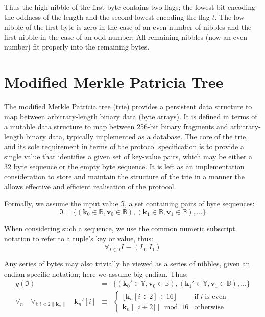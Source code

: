 \documentclass[9pt,oneside]{amsart}
\begin{document}
Thus the high nibble of the first byte contains two flags; the lowest bit encoding the oddness of the length and the second-lowest encoding the flag $t$. The low nibble of the first byte is zero in the case of an even number of nibbles and the first nibble in the case of an odd number. All remaining nibbles (now an even number) fit properly into the remaining bytes.

\section{Modified Merkle Patricia Tree}\label{app:trie}
The modified Merkle Patricia tree (trie) provides a persistent data structure to map between arbitrary-length binary data (byte arrays). It is defined in terms of a mutable data structure to map between 256-bit binary fragments and arbitrary-length binary data, typically implemented as a database. The core of the trie, and its sole requirement in terms of the protocol specification is to provide a single value that identifies a given set of key-value pairs, which may be either a 32 byte sequence or the empty byte sequence. It is left as an implementation consideration to store and maintain the structure of the trie in a manner the allows effective and efficient realisation of the protocol.

Formally, we assume the input value $\mathfrak{I}$, a set containing pairs of byte sequences:
\begin{equation}
\mathfrak{I} = \{ (\mathbf{k}_0 \in \mathbb{B}, \mathbf{v}_0 \in \mathbb{B}), (\mathbf{k}_1 \in \mathbb{B}, \mathbf{v}_1 \in \mathbb{B}), ... \}
\end{equation}

When considering such a sequence, we use the common numeric subscript notation to refer to a tuple's key or value, thus:
\begin{equation}
\forall_{I \in \mathfrak{I}} I \equiv (I_0, I_1)
\end{equation}

Any series of bytes may also trivially be viewed as a series of nibbles, given an endian-specific notation; here we assume big-endian. Thus:
\begin{eqnarray}
y(\mathfrak{I}) & = & \{ (\mathbf{k}_0' \in \mathbb{Y}, \mathbf{v}_0 \in \mathbb{B}), (\mathbf{k}_1' \in \mathbb{Y}, \mathbf{v}_1 \in \mathbb{B}), ... \} \\
\forall_n \quad \forall_{i: i < 2\lVert\mathbf{k}_n\rVert} \quad \mathbf{k}_n'[i] & \equiv &
\begin{cases}
\lfloor \mathbf{k}_n[i \div 2] \div 16 \rfloor & \text{if} \; i \; \text{is even} \\
\mathbf{k}_n[\lfloor i \div 2 \rfloor] \bmod 16 & \text{otherwise}
\end{cases}
\end{eqnarray}
\end{document}
